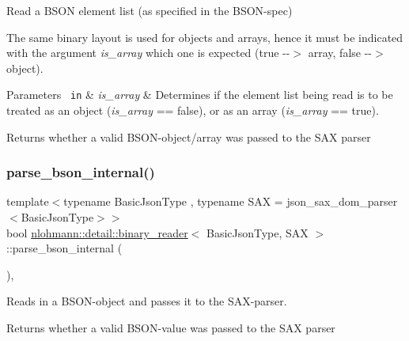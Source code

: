 Read a B\+S\+ON element list (as specified in the B\+S\+O\+N-\/spec) 

The same binary layout is used for objects and arrays, hence it must be indicated with the argument {\itshape is\+\_\+array} which one is expected (true -\/-\/$>$ array, false -\/-\/$>$ object).


\begin{DoxyParams}[1]{Parameters}
\mbox{\texttt{ in}}  & {\em is\+\_\+array} & Determines if the element list being read is to be treated as an object ({\itshape is\+\_\+array} == false), or as an array ({\itshape is\+\_\+array} == true). \\
\hline
\end{DoxyParams}
\begin{DoxyReturn}{Returns}
whether a valid B\+S\+O\+N-\/object/array was passed to the S\+AX parser 
\end{DoxyReturn}
\mbox{\label{classnlohmann_1_1detail_1_1binary__reader_a950f6ef800421fef9499af1c4c8918f5}} 
\subsubsection{\texorpdfstring{parse\_bson\_internal()}{parse\_bson\_internal()}}
{\footnotesize\ttfamily template$<$typename Basic\+Json\+Type , typename S\+AX  = json\+\_\+sax\+\_\+dom\+\_\+parser$<$\+Basic\+Json\+Type$>$$>$ \\
bool \mbox{\hyperlink{classnlohmann_1_1detail_1_1binary__reader}{nlohmann\+::detail\+::binary\+\_\+reader}}$<$ Basic\+Json\+Type, S\+AX $>$\+::parse\+\_\+bson\+\_\+internal (\begin{DoxyParamCaption}{ }\end{DoxyParamCaption})\hspace{0.3cm}{\ttfamily [inline]}, {\ttfamily [private]}}



Reads in a B\+S\+O\+N-\/object and passes it to the S\+A\+X-\/parser. 

\begin{DoxyReturn}{Returns}
whether a valid B\+S\+O\+N-\/value was passed to the S\+AX parser 
\end{DoxyReturn}
\mbox{\label{classnlohmann_1_1detail_1_1binary__reader_a2fc47768d484a22fcd04e20106da1399}} 
